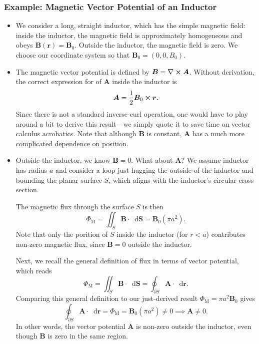\documentclass[11pt, a4paper]{article}
\newcommand{\diff}{\mathop{}\!\mathrm{d}} %
\renewcommand{\vec}[1]{\bm{#1}} %
\renewcommand{\r}{\vec{r}}
\newcommand{\B}{\vec{B}} %
\newcommand{\A}{\vec{A}} %
\renewcommand{\curl}{\nabla \cross}
\begin{document}
\subsubsection{Example: Magnetic Vector Potential of an Inductor}
\begin{itemize}
    \item We consider a long, straight inductor, which has the simple magnetic field: inside the inductor, the magnetic field is approximately homogeneous and obeys $ \B(\r) = \B_{0} $. Outside the inductor, the magnetic field is zero. We choose our coordinate system so that $ \B_{0} = (0, 0, B_{0}) $. 
	
	\item The magnetic vector potential is defined by $ \B = \curl \A $. Without derivation, the correct expression for of $ \A $ inside the inductor is 
	\begin{equation*}
		\A = \frac{1}{2}\B_{0} \cross \r.
	\end{equation*}
	Since there is not a standard inverse-curl operation, one would have to play around a bit to derive this result---we simply quote it to save time on vector calculus acrobatics. Note that although $ \B $ is constant, $ \A $ has a much more complicated dependence on position.
	
	\item Outside the inductor, we know $ \B = 0 $. What about $ \A $? We assume inductor has radius $ a $ and consider a loop just hugging the outside of the inductor and bounding the planar surface $ S $, which aligns with the inductor's circular cross section.
	
	The magnetic flux through the surface $ S $ is then
	\begin{equation*}
		\Phi_{\text{M}} = \iint_{S} \B \cdot \diff \vec{S} = \B_{0} (\pi a^{2}).
	\end{equation*}
    Note that only the porition of $ S $ inside the inductor (for $ r < a $) contributes non-zero magnetic flux, since $ \B = 0 $ outside the inductor.
	
	Next, we recall the general definition of flux in terms of vector potential, which reads
	\begin{equation*}
		\Phi_{\text{M}} = \iint_{S} \B \cdot \diff \vec{S} = \oint_{\partial S} \A \cdot \diff \r.
	\end{equation*}
    Comparing this general definition to our just-derived result $ \Phi_{\text{M}} = \pi a^{2}\B_{0} $ gives
	\begin{equation*}
		\oint_{\partial S} \A \cdot \diff \r = \Phi_{\text{M}} = \B_{0} (\pi a^{2}) \neq 0  \implies \A \neq 0.
	\end{equation*}
    In other words, the vector potential $ \A $ is non-zero outside the inductor, even though $ \B $ is zero in the same region.
	

\end{itemize}
\end{document}
